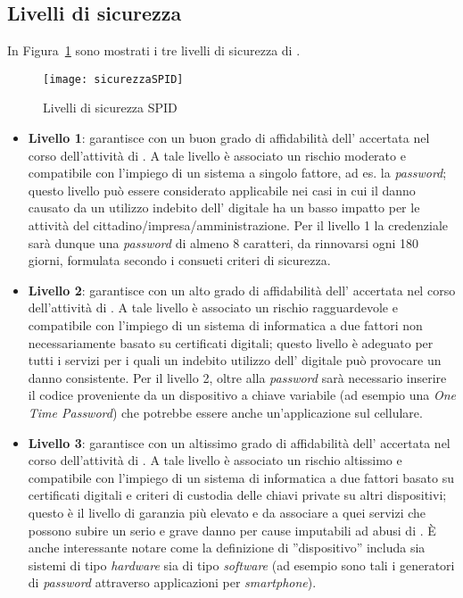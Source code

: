 \subsection{Livelli di sicurezza}
In Figura~\ref{fig:spidlivelli} sono mostrati i tre livelli di sicurezza di .
\begin{figure}[h]
\begin{center}
\texttt{[image: sicurezzaSPID]}
\caption[Livelli di sicurezza SPID]{Livelli di sicurezza SPID\protect\footnotemark}
\label{fig:spidlivelli}
\end{center}
\end{figure}
\begin{itemize}
\item \textbf{Livello 1}: garantisce con un buon grado di affidabilità dell' accertata nel corso dell'attività di . A tale livello è associato un rischio moderato e compatibile con l'impiego di un sistema  a singolo fattore, ad es. la \textit{password}; questo livello può essere considerato applicabile nei casi in cui il danno causato da un utilizzo indebito dell’ digitale ha un basso impatto per le attività del cittadino/impresa/amministrazione. Per il livello 1 la credenziale sarà dunque una \textit{password} di almeno 8 caratteri, da rinnovarsi ogni 180 giorni, formulata secondo i consueti criteri di sicurezza.
\item \textbf{Livello 2}: garantisce con un alto grado di affidabilità dell' accertata nel corso dell'attività di . A tale livello è associato un rischio ragguardevole e compatibile con l'impiego di un sistema di  informatica a due fattori non necessariamente basato su certificati digitali; questo livello è adeguato per tutti i servizi per i quali un indebito utilizzo dell’ digitale può provocare un danno consistente. Per il livello 2, oltre alla \textit{password} sarà necessario inserire il codice proveniente da un dispositivo a chiave variabile (ad esempio una \textit{One Time Password}) che potrebbe essere anche un'applicazione sul cellulare.
\item \textbf{Livello 3}: garantisce con un altissimo grado di affidabilità dell' accertata nel corso dell'attività di . A tale livello è associato un rischio altissimo e compatibile con l'impiego di un sistema di  informatica a due fattori basato su certificati digitali e criteri di custodia delle chiavi private su altri dispositivi; questo è il livello di garanzia più elevato e da associare a quei servizi che possono subire un serio e grave danno per cause imputabili ad abusi di . È anche interessante notare come la definizione di ''dispositivo'' includa sia sistemi di tipo \textit{hardware} sia di tipo \textit{software} (ad esempio sono tali i generatori di \textit{password} attraverso applicazioni per \textit{smartphone}).
\end{itemize}

